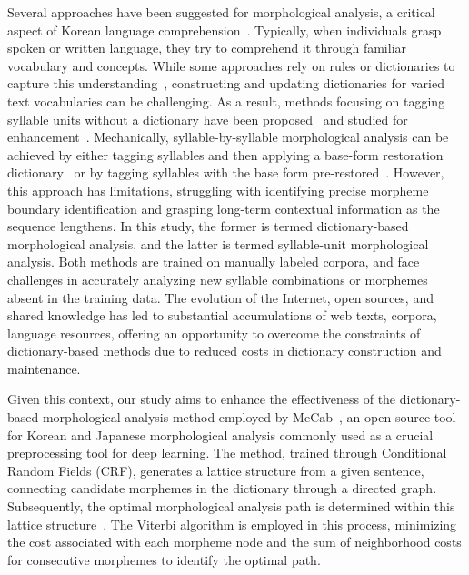 \documentclass[AMS,STIX2COL]{WileyNJD-v2}
\begin{document}
    Several approaches have been suggested for morphological analysis, a critical aspect of Korean language comprehension~\cite{KwonHC1991, LeeDG2009, ShimKS2011, LeeJS2011, ShinJC2012, LeeCK2013, NaSH2014, NaSH2015, HwangHS2016, KimHM2016, ChungES2016, LeeCH2016, Li2017, NaSH2018, KimSW2018, ChoiYS2018, MinJW2018, MinJW2019, KimHM2019, SongHJ2019, MinJW2020, SongHJ2020, ChoiYS2020, HwangHS2020, KimHJ2021, YounJY2021, MinJW2022, KimJM2022, ShinHJ2023}.
    Typically, when individuals grasp spoken or written language, they try to comprehend it through familiar vocabulary and concepts.
    While some approaches rely on rules or dictionaries to capture this understanding~\cite{KwonHC1991}, constructing and updating dictionaries for varied text vocabularies can be challenging.
    As a result, methods focusing on tagging syllable units without a dictionary have been proposed~\cite{ShimKS2011, LeeCK2013, LeeCH2016, KimHM2016} and studied for enhancement~\cite{KimSW2018, ChoiYS2018, KimHM2019, MinJW2019, SongHJ2019, SongHJ2020, YounJY2021, ShinHJ2023}.
    Mechanically, syllable-by-syllable morphological analysis can be achieved by either tagging syllables and then applying a base-form restoration dictionary~\cite{ShimKS2011, LeeCH2016} or by tagging syllables with the base form pre-restored~\cite{YounJY2021}.
    However, this approach has limitations, struggling with identifying precise morpheme boundary identification and grasping long-term contextual information as the sequence lengthens.
    In this study, the former is termed dictionary-based morphological analysis, and the latter is termed syllable-unit morphological analysis.
    Both methods are trained on manually labeled corpora, and face challenges in accurately analyzing new syllable combinations or morphemes absent in the training data.
    The evolution of the Internet, open sources, and shared knowledge has led to substantial accumulations of web texts, corpora, language resources, offering an opportunity to overcome the constraints of dictionary-based methods due to reduced costs in dictionary construction and maintenance.

    Given this context, our study aims to enhance the effectiveness of the dictionary-based morphological analysis method employed by MeCab~\cite{MeCab}, an open-source tool for Korean and Japanese morphological analysis commonly used as a crucial preprocessing tool for deep learning.
    The method, trained through Conditional Random Fields (CRF), generates a lattice structure from a given sentence, connecting candidate morphemes in the dictionary through a directed graph.
    Subsequently, the optimal morphological analysis path is determined within this lattice structure~\cite{Kudo2004, NaSH2014, NaSH2018}.
    The Viterbi algorithm is employed in this process, minimizing the cost associated with each morpheme node and the sum of neighborhood costs for consecutive morphemes to identify the optimal path.
\end{document}
